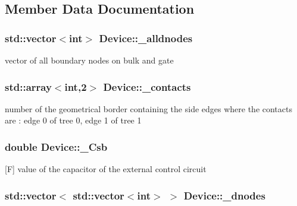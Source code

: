 \subsection{Member Data Documentation}
\hypertarget{classDevice_afcc8edfa468c7386432d3b075ad99f26}{
\subsubsection[{\-\_\-alldnodes}]{\setlength{\rightskip}{0pt plus 5cm}std\-::vector$<$int$>$ Device\-::\-\_\-alldnodes\hspace{0.3cm}{\ttfamily [protected]}}}\label{classDevice_afcc8edfa468c7386432d3b075ad99f26}
vector of all boundary nodes on bulk and gate \hypertarget{classDevice_acf7fe7f3a3e056ad1da9ae842b386401}{
\subsubsection[{\-\_\-contacts}]{\setlength{\rightskip}{0pt plus 5cm}std\-::array$<$int,2$>$ Device\-::\-\_\-contacts\hspace{0.3cm}{\ttfamily [protected]}}}\label{classDevice_acf7fe7f3a3e056ad1da9ae842b386401}
number of the geometrical border containing the side edges where the contacts are \-: edge 0 of tree 0, edge 1 of tree 1 \hypertarget{classDevice_a1c4b801f7ac108dc211c1496fe3efd6a}{
\subsubsection[{\-\_\-\-Csb}]{\setlength{\rightskip}{0pt plus 5cm}double Device\-::\-\_\-\-Csb\hspace{0.3cm}{\ttfamily [protected]}}}\label{classDevice_a1c4b801f7ac108dc211c1496fe3efd6a}
\mbox{[}F\mbox{]} value of the capacitor of the external control circuit \hypertarget{classDevice_a554d8519650b873bf40e4e5653ed346e}{
\subsubsection[{\-\_\-dnodes}]{\setlength{\rightskip}{0pt plus 5cm}std\-::vector$<$ std\-::vector$<$int$>$ $>$ Device\-::\-\_\-dnodes\hspace{0.3cm}{\ttfamily [protected]}}}\label{classDevice_a554d8519650b873bf40e4e5653ed346e}
